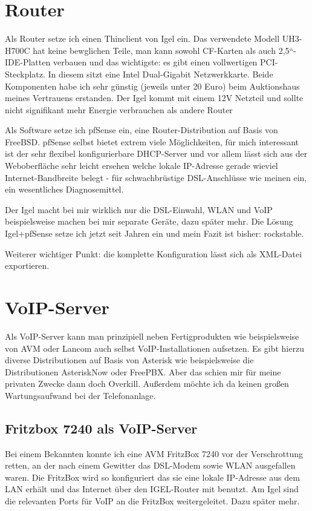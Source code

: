 \documentclass[a4paper,12pt]{scrbook}
\begin{document}
\section{Router}
Als Router setze ich einen Thinclient von Igel ein. Das verwendete Modell UH3-H700C hat keine bewglichen Teile, 
man kann sowohl CF-Karten als auch 2,5``-IDE-Platten verbauen und das wichtigste: es gibt einen vollwertigen PCI-Steckplatz.
In diesem sitzt eine Intel Dual-Gigabit Netzwerkkarte. Beide Komponenten habe ich sehr günstig (jeweils unter 20 Euro) beim
Auktionshaus meines Vertrauens erstanden. Der Igel kommt mit einem 12V Netzteil und sollte nicht signifikant mehr Energie
verbrauchen als andere Router

Als Software setze ich pfSense ein, eine Router-Distribution auf Basis von FreeBSD. pfSense selbst bietet extrem viele Möglichkeiten,
für mich interessant ist der sehr flexibel konfigurierbare DHCP-Server und vor allem lässt sich aus der Weboberfläche sehr leicht
ersehen welche lokale IP-Adresse gerade wieviel Internet-Bandbreite belegt - für schwachbrüstige DSL-Anschlüsse wie meinen ein, ein 
wesentliches Diagnosemittel. 

Der Igel macht bei mir wirklich nur die DSL-Einwahl, WLAN und VoIP beispielsweise machen bei mir separate Geräte, dazu später mehr.
Die Lösung Igel+pfSense setze ich jetzt seit Jahren ein und mein Fazit ist bisher: rockstable.

Weiterer wichtiger Punkt: die komplette Konfiguration lässt sich als XML-Datei exportieren.

\section{VoIP-Server}
Als VoIP-Server kann man prinzipiell neben Fertigprodukten wie beispielsweise von AVM oder Lancom auch selbst VoIP-Installationen aufsetzen.
Es gibt hierzu diverse Distributionen auf Basis von Asterisk wie beispielsweise die Distributionen AsteriskNow oder FreePBX. Aber das schien mir
für meine privaten Zwecke dann doch Overkill. Außerdem möchte ich da keinen großen Wartungsaufwand bei der Telefonanlage.

\subsection{Fritzbox 7240 als VoIP-Server}
Bei einem Bekannten konnte ich eine AVM FritzBox 7240 vor der Verschrottung retten, an der nach einem Gewitter das DSL-Modem sowie 
WLAN ausgefallen waren. Die FritzBox wird so konfiguriert das sie eine lokale IP-Adresse aus dem LAN erhält und das Internet über den
IGEL-Router mit benutzt. Am Igel sind die relevanten Ports für VoIP an die FritzBox weitergeleitet. Dazu später mehr.
\end{document}

